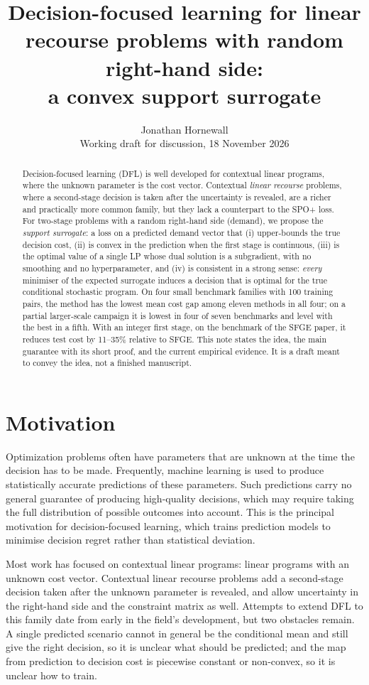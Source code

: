 \documentclass[11pt,a4paper]{article}
\title{Decision-focused learning for linear recourse problems with random right-hand side:\\
a convex support surrogate}
\author{Jonathan Hornewall\\[2pt]{\normalsize Working draft for discussion, 18 November 2026}}
\date{}
\theoremstyle{remark}
\begin{document}
\maketitle

\begin{abstract}
\noindent
Decision-focused learning (DFL) is well developed for contextual linear
programs, where the unknown parameter is the cost vector. Contextual
\emph{linear recourse} problems, where a second-stage decision is taken after
the uncertainty is revealed, are a richer and practically more common family,
but they lack a counterpart to the SPO+ loss. For two-stage problems with a
random right-hand side (demand), we propose the \emph{support surrogate}: a loss
on a predicted demand vector that (i) upper-bounds the true decision cost,
(ii) is convex in the prediction when the first stage is continuous, (iii) is
the optimal value of a single LP whose dual solution is a subgradient, with no
smoothing and no hyperparameter, and (iv) is consistent in a strong sense: \emph{every}
minimiser of the expected surrogate induces a decision that is optimal for the
true conditional stochastic program. On four small benchmark families with 100
training pairs, the method has the lowest mean cost gap among eleven methods in
all four; on a partial larger-scale campaign it is lowest in four of seven
benchmarks and level with the best in a fifth. With an integer first stage, on the
benchmark of the SFGE paper, it reduces test cost by 11--35\% relative to SFGE. This note states the idea, the main
guarantee with its short proof, and the current empirical evidence. It is a
draft meant to convey the idea, not a finished manuscript.
\end{abstract}

\section{Motivation}

Optimization problems often have parameters that are unknown at the time the
decision has to be made. Frequently, machine learning is used to produce
statistically accurate predictions of these parameters. Such predictions carry
no general guarantee of producing high-quality decisions, which may require
taking the full distribution of possible outcomes into account. This is the
principal motivation for decision-focused learning, which trains prediction
models to minimise decision regret rather than statistical deviation.

Most work has focused on contextual linear programs: linear programs with an
unknown cost vector. Contextual linear recourse problems add a second-stage
decision taken after the unknown parameter is revealed, and allow uncertainty in
the right-hand side and the constraint matrix as well. Attempts to extend DFL
to this family date from early in the field's development, but two obstacles
remain. A single predicted scenario cannot in general be the conditional mean
and still give the right decision, so it is unclear what should be predicted;
and the map from prediction to decision cost is piecewise constant or
non-convex, so it is unclear how to train.
\end{document}

